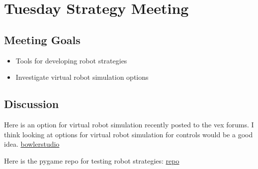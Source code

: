 \section{Tuesday Strategy Meeting}

\subsection{Meeting Goals}
\begin{itemize}
    \item Tools for developing robot strategies
    \item Investigate virtual robot simulation options
\end{itemize}

\subsection{Discussion}
Here is an option for virtual robot simulation recently posted to the vex forums. I think looking at options for virtual robot simulation for controls would be a good idea.
\href{https://www.vexforum.com/t/physics-simulation-and-cad-of-virtual-v5-robots-in-bowlerstudio-for-high-stakes-and-beyond/128191}{bowlerstudio}

Here is the pygame repo for testing robot strategies:
\href{https://github.com/NathanaelOliver/Vex-AI-Game-Analysis}{repo}